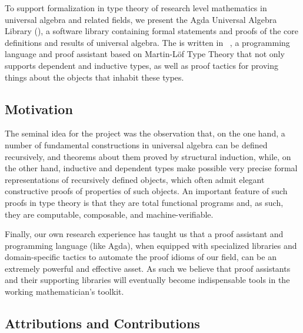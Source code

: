 To support formalization in type theory of research level mathematics in universal algebra and related fields, we present the Agda Universal Algebra Library (\agdaualib), a software library containing formal statements and proofs of the core definitions and results of universal algebra. 
The \ualib is written in \agda~\cite{Norell:2009}, a programming language and proof assistant based on Martin-L\"of Type Theory that not only supports dependent and inductive types, as well as proof tactics for proving things about the objects that inhabit these types.

\subsection{Motivation}\label{sec:motivation}
The seminal idea for the \agdaualib project was the observation that, on the one hand, a number of fundamental constructions in universal algebra can be defined recursively, and theorems about them proved by structural induction, while, on the other hand, inductive and dependent types make possible very precise formal representations of recursively defined objects, which often admit elegant constructive proofs of properties of such objects.  An important feature of such proofs in type theory is that they are total functional programs and, as such, they are computable, composable, and machine-verifiable.

Finally, our own research experience has taught us that a proof assistant and programming language (like Agda), when equipped with specialized libraries and domain-specific tactics to automate the proof idioms of our field, can be an extremely powerful and effective asset. As such we believe that proof assistants and their supporting libraries will eventually become indispensable tools in the working mathematician's toolkit.


\subsection{Attributions and Contributions}\label{sec:contributions}


